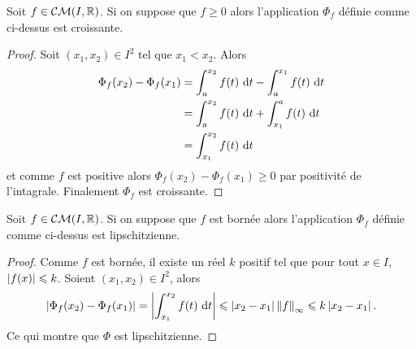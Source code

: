 \begin{prop}
  Soit $f \in \mathcal{CM}(I,\mathbb{R})$. Si on suppose que $f \geqslant 0$ alors l'application $\Phi_f$ définie comme ci-dessus est croissante.
\end{prop}
\begin{proof}
  Soit $(x_1,x_2)\in I^2$ tel que $x_1<x_2$. Alors
  \begin{align}
    \Phi_f(x_2)-\Phi_f(x_1) &= \int_a^{x_2} f(t)\,\mathop{}\mathopen{}\mathrm{d} t - \int_a^{x_1} f(t)\,\mathop{}\mathopen{}\mathrm{d} t \\
    &= \int_a^{x_2} f(t)\,\mathop{}\mathopen{}\mathrm{d} t + \int_{x_1}^a f(t)\,\mathop{}\mathopen{}\mathrm{d} t \\
    &= \int_{x_1}^{x_2} f(t)\,\mathop{}\mathopen{}\mathrm{d} t
  \end{align}
  et comme $f$ est positive alors $\Phi_f(x_2)-\Phi_f(x_1) \geqslant 0$ par positivité de l'intagrale. Finalement $\Phi_f$ est croissante.
\end{proof}

\begin{prop}
  Soit $f \in \mathcal{CM}(I,\mathbb{R})$. Si on suppose que $f$ est bornée alors l'application $\Phi_f$ définie comme ci-dessus est lipschitzienne. 
\end{prop}
\begin{proof}
  Comme $f$ est bornée, il existe un réel $k$ positif tel que pour tout $x \in I$, $\left\lvert f(x)\right\rvert\leqslant k$. Soient $(x_1,x_2) \in I^2$, alors
  \begin{equation}
    \left\lvert\Phi_f(x_2)-\Phi_f(x_1)\right\rvert = \left\lvert\int_{x_1}^{x_2} f(t)\,\mathop{}\mathopen{}\mathrm{d} t\right\rvert \leqslant \left\lvert x_2-x_1\right\rvert \left\lVert f\right\rVert_{\infty} \leqslant k \left\lvert x_2 -x_1\right\rvert.
  \end{equation}
  Ce qui montre que $\Phi$ est lipschitzienne. 
\end{proof}

